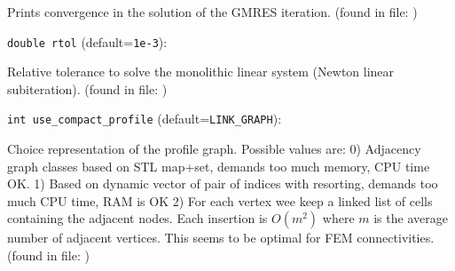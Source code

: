 Prints convergence in the solution of the GMRES iteration. 
 (found in file: \verb++)
\item\verb+double rtol+ {\rm(default=\verb|1e-3|)}:

Relative tolerance to solve the monolithic linear
system (Newton linear subiteration).
 (found in file: \verb++)
\item\verb+int use_compact_profile+ {\rm(default=\verb|LINK_GRAPH|)}:

Choice representation of the profile graph. Possible values are:
0) Adjacency graph classes
based on STL map+set, demands too much memory, CPU time OK.
1) Based on dynamic vector of pair of indices with resorting,
demands too much CPU time, RAM is OK
2) For each vertex wee keep a linked list of cells containing the
adjacent nodes. Each insertion is $O(m^2)$ where $m$ is the average
number of adjacent vertices. This seems to be optimal for
FEM connectivities.
 (found in file: \verb++)
